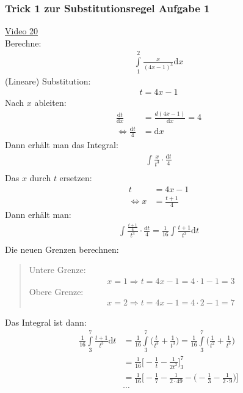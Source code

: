 \subsubsection{Trick 1 zur Substitutionsregel Aufgabe 1}
\href{https://youtu.be/IjIGyA63qtU}{Video 20}\\
Berechne:\\
\begin{align*}
\int\limits_{1}^{2} \frac{x}{(4x-1)^3}\mathrm{d}x
\end{align*}
(Lineare) Substitution:\\
\begin{align*}
t=4x-1
\end{align*}
Nach $ x $ ableiten:\\
\begin{align*}
\frac{\mathrm{d}t}{\mathrm{d}x}&=\frac{d(4x-1)}{\mathrm{d}x}=4\\
\Leftrightarrow \frac{\mathrm{d}t}{4}&=\mathrm{d}x
\end{align*}
Dann erhält man das Integral:\\
\begin{align*}
\int\limits_{}^{} \frac{x}{t^3}\cdot \frac{\mathrm{d}t}{4}
\end{align*}
Das $ x $ durch $ t $ ersetzen:\\
\begin{align*}
t&=4x-1\\
\Leftrightarrow x&=\frac{t+1}{4}
\end{align*}
Dann erhält man:\\
\begin{align*}
\int\limits_{}^{} \frac{\frac{t+1}{4}}{t^3}\cdot \frac{\mathrm{d}t}{4}=\frac{1}{16}\int\limits_{}^{} \frac{t+1}{t^3}\mathrm{d}t
\end{align*}
Die neuen Grenzen berechnen:\\
\begin{quote}
	Untere Grenze:\\
	\begin{align*}
	x=1\Rightarrow t=4x-1=4\cdot 1-1=3
	\end{align*}
	Obere Grenze:\\
	\begin{align*}
	x=2\Rightarrow t=4x-1=4\cdot 2-1=7
	\end{align*}
\end{quote}
Das Integral ist dann:\\
\begin{align*}
\frac{1}{16}\int\limits_{3}^{7} \frac{t+1}{t^3}\mathrm{d}t&=\frac{1}{16}\int\limits_{3}^{7} \bigg(\frac{t}{t^3}+\frac{1}{t^3}\bigg)=\frac{1}{16}\int\limits_{3}^{7} \bigg(\frac{1}{t^2}+\frac{1}{t^3}\bigg)\\
&=\frac{1}{16}\bigg[-\frac{1}{t}-\frac{1}{2t^2}\bigg]^7_3\\
&=\frac{1}{16}\bigg[-\frac{1}{7}-\frac{1}{2\cdot 49}-\bigg(-\frac{1}{3}-\frac{1}{2\cdot 9}\bigg)\bigg]\\
&\cdots
\end{align*}
